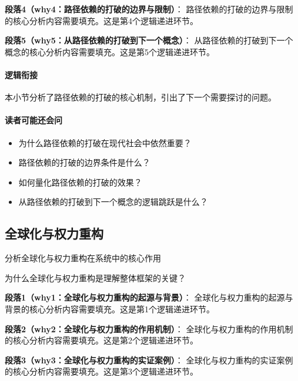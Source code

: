\documentclass[../main.tex]{subfiles}
\begin{document}
\textbf{段落4（why4：路径依赖的打破的边界与限制）}：
路径依赖的打破的边界与限制的核心分析内容需要填充。这是第4个逻辑递进环节。


\textbf{段落5（why5：从路径依赖的打破到下一个概念）}：
从路径依赖的打破到下一个概念的核心分析内容需要填充。这是第5个逻辑递进环节。


\paragraph*{逻辑衔接}
本小节分析了路径依赖的打破的核心机制，引出了下一个需要探讨的问题。

\paragraph*{读者可能还会问}
\begin{itemize}
\item 为什么路径依赖的打破在现代社会中依然重要？
\item 路径依赖的打破的边界条件是什么？
\item 如何量化路径依赖的打破的效果？
\item 从路径依赖的打破到下一个概念的逻辑跳跃是什么？
\end{itemize}


\subsection{全球化与权力重构}

\begin{motivation}
分析全球化与权力重构在系统中的核心作用
\end{motivation}

\begin{logicmap}
[逻辑链占位]
\end{logicmap}

\begin{questionbox}
为什么全球化与权力重构是理解整体框架的关键？
\end{questionbox}

\textbf{段落1（why1：全球化与权力重构的起源与背景）}：
全球化与权力重构的起源与背景的核心分析内容需要填充。这是第1个逻辑递进环节。


\textbf{段落2（why2：全球化与权力重构的作用机制）}：
全球化与权力重构的作用机制的核心分析内容需要填充。这是第2个逻辑递进环节。


\textbf{段落3（why3：全球化与权力重构的实证案例）}：
全球化与权力重构的实证案例的核心分析内容需要填充。这是第3个逻辑递进环节。
\end{document}
